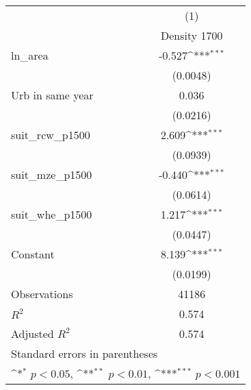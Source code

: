 {
\def\sym#1{\ifmmode^{#1}\else\(^{#1}\)\fi}
\begin{tabular}{l*{1}{c}}
\toprule
                    &\multicolumn{1}{c}{(1)}\\
                    &\multicolumn{1}{c}{Density 1700}\\
\midrule
ln\_area             &      -0.527\sym{***}\\
                    &    (0.0048)         \\
\addlinespace
Urb in same year    &       0.036         \\
                    &    (0.0216)         \\
\addlinespace
suit\_rcw\_p1500      &       2.609\sym{***}\\
                    &    (0.0939)         \\
\addlinespace
suit\_mze\_p1500      &      -0.440\sym{***}\\
                    &    (0.0614)         \\
\addlinespace
suit\_whe\_p1500      &       1.217\sym{***}\\
                    &    (0.0447)         \\
\addlinespace
Constant            &       8.139\sym{***}\\
                    &    (0.0199)         \\
\midrule
Observations        &       41186         \\
\(R^{2}\)           &       0.574         \\
Adjusted \(R^{2}\)  &       0.574         \\
\bottomrule
\multicolumn{2}{l}{\footnotesize Standard errors in parentheses}\\
\multicolumn{2}{l}{\footnotesize \sym{*} \(p<0.05\), \sym{**} \(p<0.01\), \sym{***} \(p<0.001\)}\\
\end{tabular}
}
